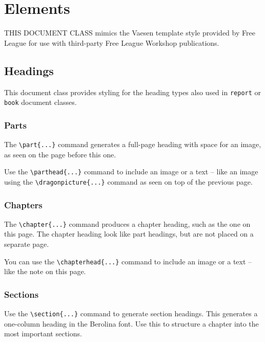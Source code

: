 \documentclass[english]{vaesen-supplement}
\begin{document}
\chapter{Elements}

\noindent THIS DOCUMENT CLASS mimics the Vaesen template style provided by Free League for use with third-party Free League Workshop publications.

\section{Headings}
This document class provides styling for the heading types also used in \texttt{report} or \texttt{book} document classes.

\subsection{Parts}
The \verb|\part{...}| command generates a full-page heading with space for an image, as seen on the page before this one. 

Use the \verb|\parthead{...}| command to include an image or a text -- like an image using the \verb|\dragonpicture{...}| command as seen on top of the previous page. 

\subsection{Chapters}
The \verb|\chapter{...}| command produces a chapter heading, such as the one on this page. The chapter heading look like part headings, but are not placed on a separate page. 

You can use the \verb|\chapterhead{...}| command to include an image or a text -- like the note on this page. 


\subsection{Sections}
Use the \verb|\section{...}| command to generate section headings. This generates a one-column heading in the Berolina font. Use this to structure a chapter into the most important sections. 
\end{document}
